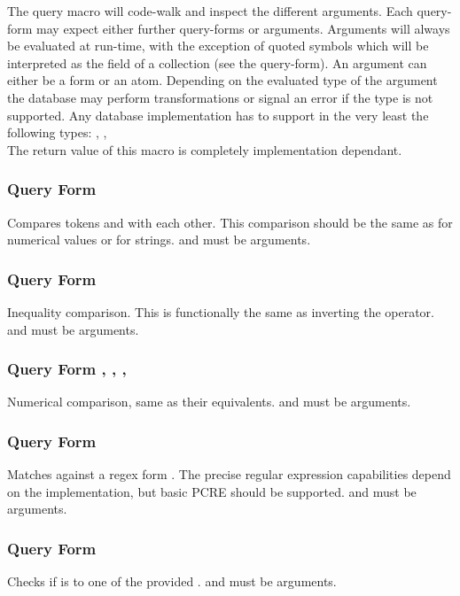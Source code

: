 The query macro will code-walk and inspect the different arguments. Each query-form may expect either further query-forms or arguments. Arguments will always be evaluated at run-time, with the exception of quoted symbols which will be interpreted as the field of a collection (see the  query-form). An argument can either be a form or an atom. Depending on the evaluated type of the argument the database may perform transformations or signal an error if the type is not supported. Any database implementation has to support in the very least the following types: , ,  \\

The return value of this macro is completely implementation dependant.
\subsubsection{Query Form \inline{:=}}
Compares tokens  and  with each other. This comparison should be the same as  for numerical values or  for strings.  and  must be arguments.
\subsubsection{Query Form \inline{:!=}}
Inequality comparison. This is functionally the same as inverting the \inline{=} operator.  and  must be arguments.
\subsubsection{Query Form \inline{:>}, \inline{:<}, \inline{:<=}, \inline{:>=}}
Numerical comparison, same as their  equivalents.  and  must be arguments.
\subsubsection{Query Form }
Matches  against a regex form . The precise regular expression capabilities depend on the implementation, but basic PCRE should be supported.
 and  must be arguments.
\subsubsection{Query Form }
Checks if  is \inline{=} to one of the provided .
 and  must be arguments.
